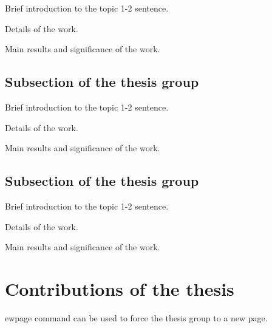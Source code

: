\documentclass[12pt,a4paper]{extarticle}
\begin{document}

Brief introduction to the topic 1-2 sentence.

Details of the work.

Main results and significance of the work.

\subsection{Subsection of the thesis group}


Brief introduction to the topic 1-2 sentence.

Details of the work.

Main results and significance of the work.

\subsection{Subsection of the thesis group}


Brief introduction to the topic 1-2 sentence.

Details of the work.

Main results and significance of the work.

\vspace*{1em}

\section{Contributions of the thesis}
ewpage command can be used to force the thesis group to a new page.
\end{document}
